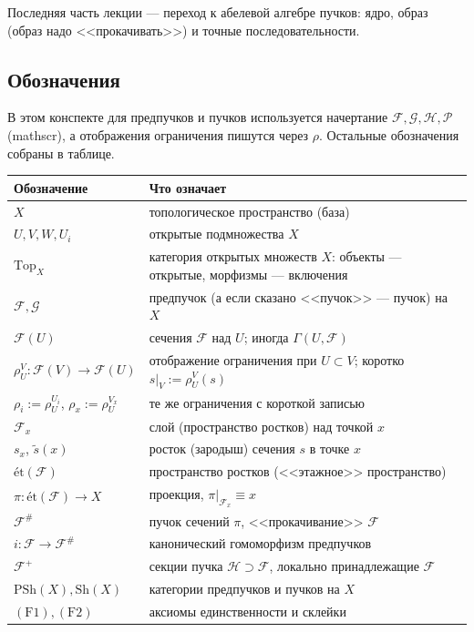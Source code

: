 \documentclass[11pt,b5paper]{article}
\newcommand{\et}{\text{ét}}
\newcommand{\Sh}{\mathrm{Sh}}
\newcommand{\PSh}{\mathrm{PSh}}
\newcommand{\Shv}[1]{\mathscr{#1}}   %
\newcommand{\Top}{\mathrm{Top}}
\newcommand{\res}{\rho}              %
\theoremstyle{plain}
\theoremstyle{definition}
\theoremstyle{remark}
\let\brutsubsection\subsection
\renewcommand{\subsection}{\Needspace{5\baselineskip}\brutsubsection}
\begin{document}
Последняя часть лекции --- переход к абелевой алгебре пучков: ядро,
образ (образ надо <<прокачивать>>) и точные последовательности.

\subsection{Обозначения}
В этом конспекте для предпучков и пучков используется начертание
$\Shv{F},\Shv{G},\Shv{H},\Shv{P}$ (mathscr), а отображения ограничения
пишутся через $\rho$. Остальные обозначения собраны в таблице.

\begin{center}
\small
\renewcommand{\arraystretch}{1.25}
\begin{tabular}{@{}p{}p{}@{}}
\toprule
Обозначение & Что означает \\
\midrule
$X$ & топологическое пространство (база) \\
$U,V,W,U_i$ & открытые подмножества $X$ \\
$\Top_X$ & категория открытых множеств $X$: объекты --- открытые,
 морфизмы --- включения \\
$\Shv{F},\Shv{G}$ & предпучок (а если сказано <<пучок>> --- пучок) на $X$ \\
$\Shv{F}(U)$ & сечения $\Shv{F}$ над $U$; иногда $\Gamma(U,\Shv{F})$ \\
$\res^{V}_{U}\colon\Shv{F}(V)\to\Shv{F}(U)$ &
 отображение ограничения при $U\subset V$; коротко
 $s|_{V}:=\res^{V}_{U}(s)$ \\
$\res_i:=\res^{U_i}_{U}$, $\res_x:=\res^{V_x}_{U}$ &
 те же ограничения с короткой записью \\
$\Shv{F}_x$ & слой (пространство ростков) над точкой $x$ \\
$s_x$, $\tilde s(x)$ & росток (зародыш) сечения $s$ в точке $x$ \\
$\et(\Shv{F})$ & пространство ростков (<<этажное>> пространство) \\
$\pi\colon\et(\Shv{F})\to X$ & проекция, $\pi|_{\Shv{F}_x}\equiv x$ \\
$\Shv{F}^{\#}$ & пучок сечений $\pi$, <<прокачивание>> $\Shv{F}$ \\
$i\colon\Shv{F}\to\Shv{F}^{\#}$ & канонический гомоморфизм предпучков \\
$\Shv{F}^{+}$ & секции пучка $\Shv{H}\supset\Shv{F}$, локально
 принадлежащие $\Shv{F}$ \\
$\PSh(X),\Sh(X)$ & категории предпучков и пучков на $X$ \\
$(\mathrm{F1}),(\mathrm{F2})$ & аксиомы единственности и склейки \\
\bottomrule
\end{tabular}
\end{center}
\end{document}
